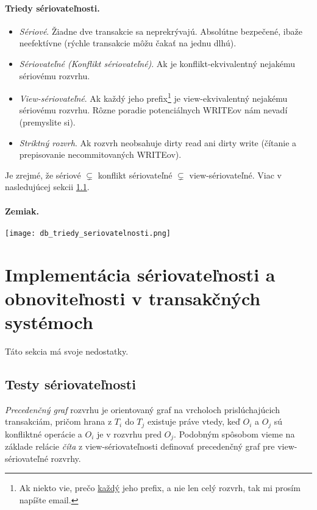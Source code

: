 \documentclass[10pt,a4paper]{article}
\begin{document}
\paragraph{Triedy sériovateľnosti.}
\begin{itemize}
\item \emph{Sériové}. Žiadne dve transakcie sa neprekrývajú. Absolútne bezpečené, ibaže neefektívne (rýchle transakcie môžu čakať na jednu dlhú).
\item \emph{Sériovateľné (Konflikt sériovateľné)}. Ak je konflikt-ekvivalentný nejakému sériovému rozvrhu. 
\item \emph{View-sériovateľné}. Ak každý jeho prefix\footnote{Ak niekto vie, prečo \underline{každý} jeho prefix, a nie len celý rozvrh, tak mi prosím napíšte email.} je view-ekvivalentný nejakému sériovému rozvrhu. Rôzne poradie potenciálnych WRITEov nám nevadí (premyslite si). 
\item \emph{Striktný rozvrh}. Ak rozvrh neobsahuje dirty read ani dirty write (čítanie a prepisovanie necommitovaných WRITEov). 
\end{itemize}

Je zrejmé, že sériové $\subsetneq$ konflikt sériovateľné $\subsetneq$ view-sériovateľné.
Viac v nasledujúcej sekcii \ref{test_seriovatelnosti}.

\paragraph{Zemiak.}
\begin{center}
\texttt{[image: db\_triedy\_seriovatelnosti.png]}
\end{center}
    
\section{Implementácia sériovateľnosti a obnoviteľnosti v transakčných systémoch} 
Táto sekcia má svoje nedostatky.

\subsection{Testy sériovateľnosti}
\label{test_seriovatelnosti}

\emph{Precedenčný graf} rozvrhu je orientovaný graf na vrcholoch prislúchajúcich transakciám,
pričom hrana z $T_i$ do $T_j$ existuje práve vtedy, keď $O_i$ a $O_j$ sú konfliktné operácie a $O_i$ je v rozvrhu pred $O_j$.  
Podobným spôsobom vieme na základe relácie \emph{číta} z view-sériovateľnosti definovať precedenčný graf pre view-sériovateľné rozvrhy. 
\end{document}
